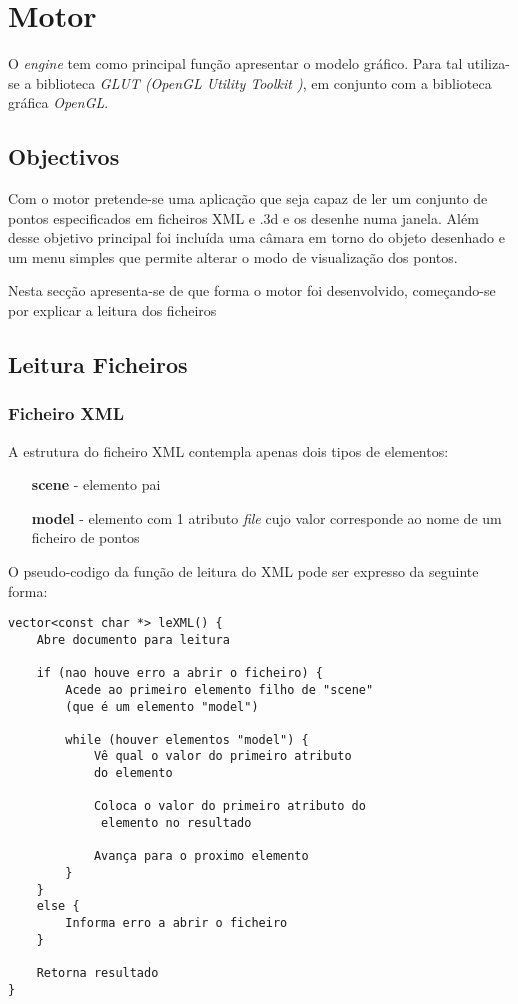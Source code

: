 \chapter{Motor}
\label{cap:p2}

O \textit{engine} tem como principal função apresentar o modelo gráfico. Para
tal utiliza-se a biblioteca \textit{GLUT (OpenGL Utility Toolkit )}, em conjunto com
a biblioteca gráfica \textit{OpenGL}.


\section{Objectivos}

Com o motor pretende-se uma aplicação que seja capaz de ler um conjunto de pontos especificados em ficheiros XML e .3d e os desenhe numa janela. Além desse objetivo principal foi incluída uma câmara em torno do objeto desenhado e um menu simples que permite alterar o modo de visualização dos pontos.

Nesta secção apresenta-se de que forma o motor foi desenvolvido, começando-se por explicar a leitura dos ficheiros

\section{Leitura Ficheiros}

\subsection{Ficheiro XML}

A estrutura do ficheiro XML contempla apenas dois tipos de elementos:

\begin{itemize}
	\item[\textbf{scene}] - elemento pai
	\item[\textbf{model}] - elemento com 1 atributo \textit{file} cujo valor corresponde ao nome de um ficheiro de pontos
\end{itemize}



O pseudo-codigo da função de leitura do XML pode ser expresso da seguinte forma:

\begin{Verbatim}
vector<const char *> leXML() {
	Abre documento para leitura
	
	if (nao houve erro a abrir o ficheiro) {
		Acede ao primeiro elemento filho de "scene" 
		(que é um elemento "model")
		
		while (houver elementos "model") {
			Vê qual o valor do primeiro atributo 
			do elemento
			
			Coloca o valor do primeiro atributo do
			 elemento no resultado
			 
			Avança para o proximo elemento
		}
	}
	else {
		Informa erro a abrir o ficheiro
	}
	
	Retorna resultado
}
\end{Verbatim}


